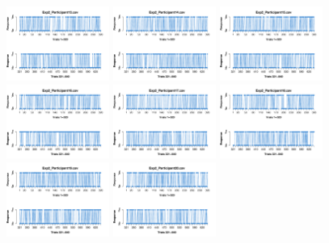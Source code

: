 \begin{itemize}
\begin{figure}[th]
\includegraphics[width=0.30\textwidth]{Figures/Response_Exp2_P13} \includegraphics[width=0.30\textwidth]{Figures/Response_Exp2_P14} \includegraphics[width=0.30\textwidth]{Figures/Response_Exp2_P15}
\includegraphics[width=0.30\textwidth]{Figures/Response_Exp2_P16} \includegraphics[width=0.30\textwidth]{Figures/Response_Exp2_P17} \includegraphics[width=0.30\textwidth]{Figures/Response_Exp2_P18}
\includegraphics[width=0.30\textwidth]{Figures/Response_Exp2_P19} \includegraphics[width=0.30\textwidth]{Figures/Response_Exp2_P20} 

\end{figure}
\end{itemize}
